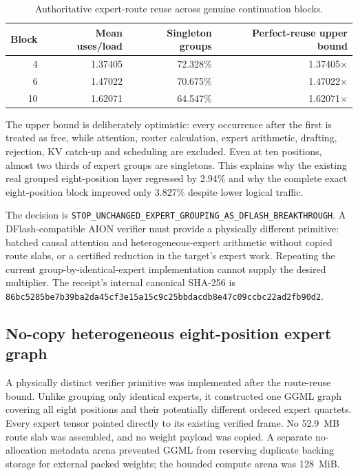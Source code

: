 \begin{table}[ht]
\centering
\begin{tabular}{rrrr}
\toprule
Block & Mean uses/load & Singleton groups & Perfect-reuse upper bound \\
\midrule
4 & 1.37405 & 72.328\% & 1.37405$\times$ \\
6 & 1.47022 & 70.675\% & 1.47022$\times$ \\
10 & 1.62071 & 64.547\% & 1.62071$\times$ \\
\bottomrule
\end{tabular}
\caption{Authoritative expert-route reuse across genuine continuation blocks.}
\end{table}

The upper bound is deliberately optimistic: every occurrence after the first
is treated as free, while attention, router calculation, expert arithmetic,
drafting, rejection, KV catch-up and scheduling are excluded.  Even at ten
positions, almost two thirds of expert groups are singletons.  This explains
why the existing real grouped eight-position layer regressed by 2.94\% and why
the complete exact eight-position block improved only 3.827\% despite lower
logical traffic.

The decision is
\texttt{STOP\_UNCHANGED\_EXPERT\_GROUPING\_AS\_DFLASH\_BREAKTHROUGH}.  A
DFlash-compatible AION verifier must provide a physically different primitive:
batched causal attention and heterogeneous-expert arithmetic without copied
route slabs, or a certified reduction in the target's expert work.  Repeating
the current group-by-identical-expert implementation cannot supply the desired
multiplier.  The receipt's internal canonical SHA-256 is
\texttt{86bc5285be7b39ba2da45cf3e15a15c9c25bbdacdb8e47c09ccbc22ad2fb90d2}.

\subsection{No-copy heterogeneous eight-position expert graph}

A physically distinct verifier primitive was implemented after the route-reuse
bound.  Unlike grouping only identical experts, it constructed one GGML graph
covering all eight positions and their potentially different ordered expert
quartets.  Every expert tensor pointed directly to its existing verified frame.
No 52.9~MB route slab was assembled, and no weight payload was copied.  A
separate no-allocation metadata arena prevented GGML from reserving duplicate
backing storage for external packed weights; the bounded compute arena was
128~MiB.


